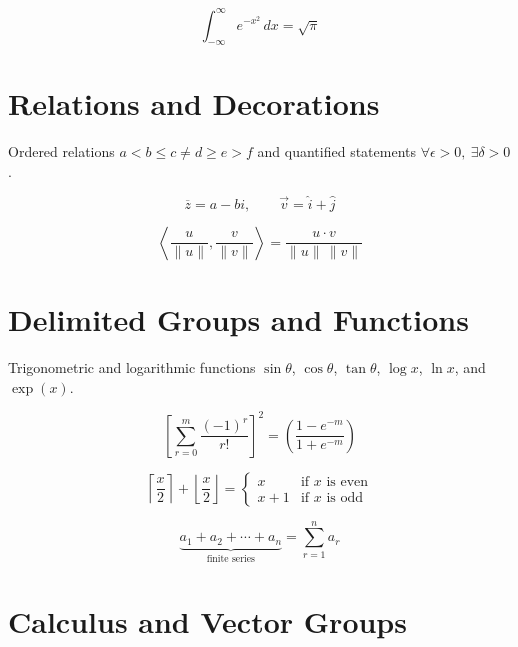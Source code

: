 \documentclass[12pt]{article}
\begin{document}
\begin{equation}
\int_{-\infty}^{\infty} e^{-x^2}\,dx = \sqrt{\pi}
\end{equation}

\section{Relations and Decorations}

Ordered relations $a < b \leq c \neq d \geq e > f$ and quantified
statements $\forall \epsilon > 0,\ \exists \delta > 0$.

\begin{equation}
\overline{z} = a - bi, \qquad \vec{v} = \widehat{i} + \widehat{j}
\end{equation}

\begin{equation}
\left\langle \frac{u}{\|u\|}, \frac{v}{\|v\|} \right\rangle
= \frac{u \cdot v}{\|u\|\,\|v\|}
\end{equation}

\section{Delimited Groups and Functions}

Trigonometric and logarithmic functions $\sin \theta$, $\cos \theta$,
$\tan \theta$, $\log x$, $\ln x$, and $\exp(x)$.

\begin{equation}
\left[\sum_{r=0}^{m} \frac{(-1)^r}{r!}\right]^2
= \left(\frac{1-e^{-m}}{1+e^{-m}}\right)
\end{equation}

\begin{equation}
\left\lceil \frac{x}{2} \right\rceil
+ \left\lfloor \frac{x}{2} \right\rfloor
= \begin{cases}
x & \text{if } x \text{ is even} \\
x+1 & \text{if } x \text{ is odd}
\end{cases}
\end{equation}

\begin{equation}
\underbrace{a_1 + a_2 + \cdots + a_n}_{\text{finite series}}
= \sum_{r=1}^{n} a_r
\end{equation}

\section{Calculus and Vector Groups}
\end{document}
